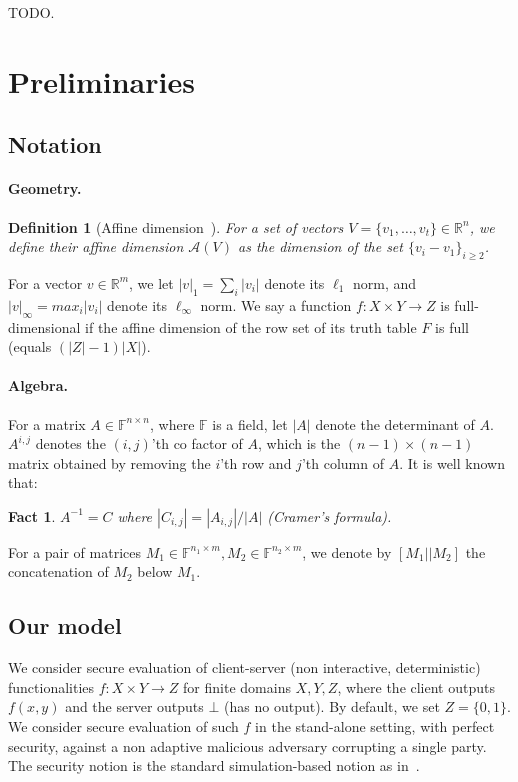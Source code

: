 \documentclass[a4paper]{article}
\newtheorem{definition}{Definition}[section]
\newtheorem{fact}{Fact}
\newcommand{\F}{\mathbb{F}}
\newcommand{\R}{\mathbb{R}}
\newcommand{\affine}[1]{\mathcal{A}(#1)}
\begin{document}
TODO.
\section{Preliminaries}


\subsection{Notation} 

\paragraph{Geometry.} 
\begin{definition}[Affine dimension~\cite{Ash14}]
	For a set of vectors $V=\{v_1,\ldots,v_t\}\in\R^n$, we define their affine dimension $\affine{V}$ as the dimension of the set
	$\{v_i-v_1\}_{i\geq 2}$. 
\end{definition}
For a vector $v\in \R^m$, 
we let $|v|_1=\sum_i|v_i|$ denote its $\ell_1$ norm, and $|v|_\infty=max_i |v_i|$ denote its $\ell_\infty$ norm.
We say a function $f:X\times Y\rightarrow Z$ is full-dimensional if the affine dimension of the row set of its truth table $F$ is full (equals $(|Z|-1)|X|$).

\paragraph{Algebra.}
For a matrix $A\in \F^{n\times n}$, where $\F$ is a field, let
$|A|$ denote the determinant of $A$. $A^{i,j}$ denotes the $(i,j)$'th co factor of $A$, which is the $(n-1)\times(n-1)$ matrix obtained by removing the $i$'th row and $j$'th column of $A$.
It is well known that:
\begin{fact}\label{fact-cramer}
	$A^{-1}=C$ where $|C_{i,j}|=|A_{i,j}|/|A|$
	(Cramer's formula).
\end{fact}
For a pair of matrices $M_1\in \F^{n_1\times m},M_2\in \F^{n_2\times m}$, we denote by $[M_1||M_2]$ the concatenation of $M_2$ below $M_1$.


\subsection{Our model}
We consider secure evaluation of client-server (non interactive, deterministic) functionalities $f:X\times Y\rightarrow Z$ for finite domains $X,Y,Z$, where the client outputs $f(x,y)$ and the server outputs $\bot$ (has no output). By default, we set $Z=\{0,1\}$. We consider secure evaluation of such $f$ in the stand-alone setting, with perfect security, against a non adaptive malicious adversary corrupting a single party. The security notion is the standard simulation-based notion as in~\cite{Gol}.
\end{document}
